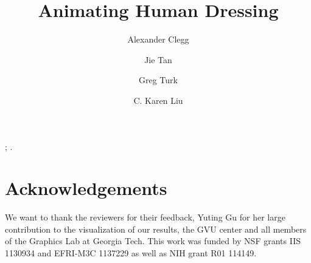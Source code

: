 \documentclass[conference]{acmsiggraph}
\title{Animating Human Dressing}
\author{Alexander Clegg  \and Jie Tan  %
\and  Greg Turk  \and  C. Karen Liu }
\affiliation{Georgia Institute of Technology}
\begin{document}


\maketitle


\begin{abstract}

\end{abstract}

\begin{CRcatlist}
  ;
  .
\end{CRcatlist}

\keywordlist
\copyrightspace










\section*{Acknowledgements}

We want to thank the reviewers for their feedback, Yuting Gu
for her large contribution to the visualization of our results, the GVU center and all members of the Graphics Lab at Georgia Tech. This work was funded by NSF grants IIS 1130934 and EFRI-M3C 1137229 as well as NIH grant R01 114149.




%
\end{document}
